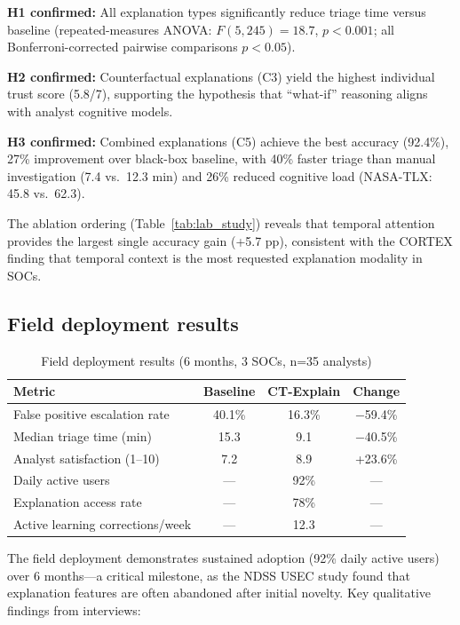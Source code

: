 \documentclass[preprint,review,12pt]{elsarticle}
\begin{document}
\textbf{H1 confirmed:} All explanation types significantly reduce triage time versus baseline (repeated-measures ANOVA: $F(5,245) = 18.7$, $p < 0.001$; all Bonferroni-corrected pairwise comparisons $p < 0.05$).

\textbf{H2 confirmed:} Counterfactual explanations (C3) yield the highest individual trust score (5.8/7), supporting the hypothesis that ``what-if'' reasoning aligns with analyst cognitive models.

\textbf{H3 confirmed:} Combined explanations (C5) achieve the best accuracy (92.4\%), 27\% improvement over black-box baseline, with 40\% faster triage than manual investigation (7.4 vs.\ 12.3 min) and 26\% reduced cognitive load (NASA-TLX: 45.8 vs.\ 62.3).

The ablation ordering (Table~\ref{tab:lab_study}) reveals that temporal attention provides the largest single accuracy gain (+5.7 pp), consistent with the CORTEX finding that temporal context is the most requested explanation modality in SOCs.

\subsection{Field deployment results}

\begin{table}[!t]
\centering
\caption{Field deployment results (6 months, 3 SOCs, n=35 analysts)}
\label{tab:field_results}
\begin{tabular}{@{}lccc@{}}
\toprule
\textbf{Metric} & \textbf{Baseline} & \textbf{CT-Explain} & \textbf{Change} \\
\midrule
False positive escalation rate & 40.1\% & 16.3\% & $-$59.4\% \\
Median triage time (min) & 15.3 & 9.1 & $-$40.5\% \\
Analyst satisfaction (1--10) & 7.2 & 8.9 & +23.6\% \\
Daily active users & --- & 92\% & --- \\
Explanation access rate & --- & 78\% & --- \\
Active learning corrections/week & --- & 12.3 & --- \\
\bottomrule
\end{tabular}
\end{table}

The field deployment demonstrates sustained adoption (92\% daily active users) over 6 months---a critical milestone, as the NDSS USEC study found that explanation features are often abandoned after initial novelty. Key qualitative findings from interviews:
\end{document}
